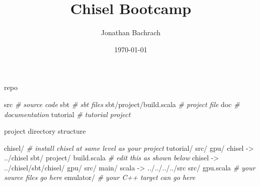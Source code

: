 \documentclass[xcolor=pdflatex,dvipsnames,table]{beamer}
\title{Chisel Bootcamp}
\author{Jonathan Bachrach}
\date{\today}
\institute[UC Berkeley]{EECS UC Berkeley}
\newenvironment{FramedSemiVerb}%
{\begin{Sbox}\begin{minipage}{.94\textwidth}\begin{semiverbatim}}%
{\end{semiverbatim}\end{minipage}\end{Sbox}
\setlength{\fboxsep}{8pt}\fbox{\TheSbox}}
\newenvironment{FramedVerb}%
{\VerbatimEnvironment
\begin{Sbox}\begin{minipage}{.94\textwidth}\begin{Verbatim}}%
{\end{Verbatim}\end{minipage}\end{Sbox}
\setlength{\fboxsep}{8pt}\fbox{\TheSbox}}
\newcommand{\comment}[1]{{\color{Green}\it\smaller #1}}
\begin{document}
\begin{frame}
\titlepage
\end{frame}



\begin{frame}[fragile]{repo}
\begin{FramedSemiVerb}
src                     \comment{\# source code}
sbt                     \comment{\# sbt files}
sbt/project/build.scala \comment{\# project file}
doc                     \comment{\# documentation}
tutorial                \comment{\# tutorial project}
\end{FramedSemiVerb}
\end{frame}

\begin{frame}[fragile]{project directory structure}
\begin{footnotesize}
\begin{FramedSemiVerb}
chisel/           \comment{\# install chisel at same level as your project}
  tutorial/
  src/
gpu/
  chisel -> ../chisel
  sbt/
    project/
      build.scala \comment{\# edit this as shown below}
    chisel -> ../chisel/sbt/chisel/
    gpu/
      src/
        main/
          scala -> ../../../../src
  src/ 
    gpu.scala     \comment{\# your source files go here}
  emulator/       \comment{\# your C++ target can go here}
\end{FramedSemiVerb}
\end{footnotesize}

\end{frame}
\end{document}
